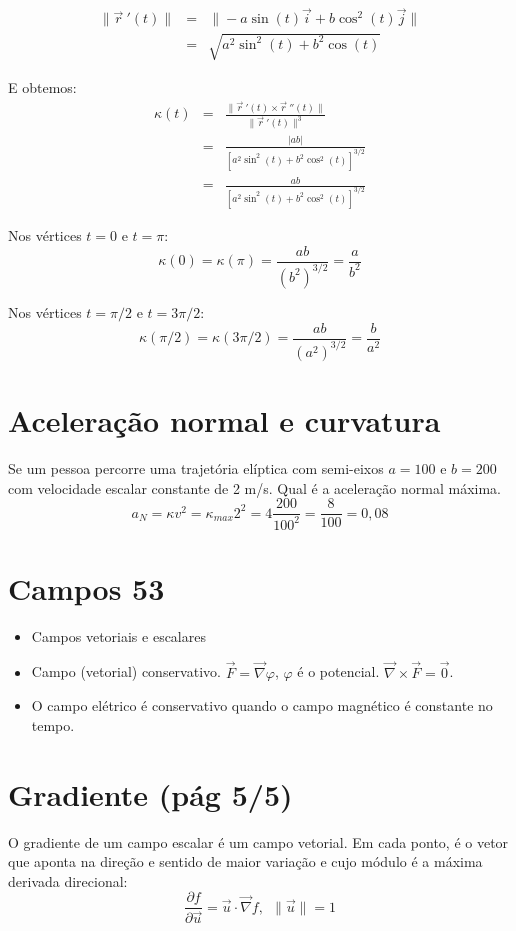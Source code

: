\documentclass[a4paper,10pt]{book}
\begin{document}
 
 \begin{eqnarray*}
\|\vec{r}\!~'(t)\| &=&\|-a\sin(t)\vec{i}+b\cos^2(t)\vec{j}\|\\
&=& \sqrt{a^2\sin^2(t)+b^2\cos(t)}
 \end{eqnarray*}

E obtemos: 
 \begin{eqnarray*}
  \kappa(t)&=&\frac{\|\vec{r}~\!'(t)\times \vec{r}~\!''(t)\|}{\|\vec{r}~\!'(t)\|^3}\\
  &=&\frac{|ab|}{\left[a^2\sin^2(t)+b^2\cos^2(t)\right]^{3/2}}\\ &=&\frac{ab}{\left[a^2\sin^2(t)+b^2\cos^2(t)\right]^{3/2}}
 \end{eqnarray*}

 Nos vértices $t=0$ e $t=\pi$:
 $$\kappa(0)=\kappa(\pi)=\frac{ab}{(b^2)^{3/2}}=\frac{a}{b^2}$$
 
 
 Nos vértices $t=\pi/2$ e $t=3\pi/2$:
 $$\kappa(\pi/2)=\kappa(3\pi/2)=\frac{ab}{(a^2)^{3/2}}=\frac{b}{a^2}$$
 
 
 \section{Aceleração normal e curvatura}
 Se um pessoa percorre uma trajetória elíptica com semi-eixos $a=100$ e $b=200$ com velocidade escalar constante de 2 m/s. Qual é a aceleração normal máxima.
 $$a_N = \kappa v^2=\kappa_{max} 2^2=4\frac{200}{100^2}=\frac{8}{100}=0,08$$
 
 \section{Campos 53}
 \begin{itemize}
  \item Campos vetoriais e escalares
  \item Campo (vetorial) conservativo. $\vec{F}=\vec{\nabla}\varphi$, $\varphi$ é o potencial. $\vec{\nabla}\times\vec{F}=\vec{0}$.
  \item O campo elétrico é conservativo quando o campo magnético é constante no tempo.
  \end{itemize}

\section{Gradiente (pág 5/5)}
O gradiente de um campo escalar é um campo vetorial. Em cada ponto, é o vetor que aponta na direção e sentido de maior variação e cujo módulo é a máxima derivada direcional:
  $$\frac{\partial f}{\partial \vec{u}}=\vec{u}\cdot\vec{\nabla} f,~~\|\vec{u}\|=1$$ 
\end{document}
